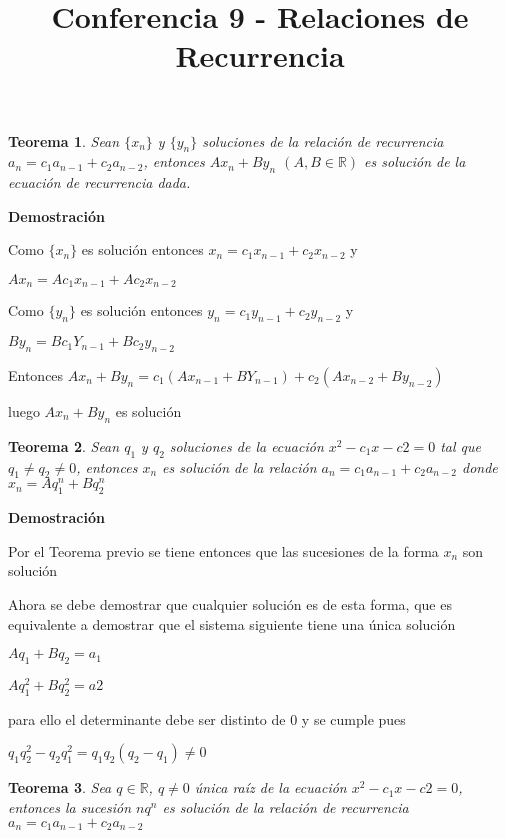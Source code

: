 \documentclass[a4paper,12pt]{report}
\title{Conferencia 9 - Relaciones de Recurrencia}
\author{}
\newtheorem*{teo}{Teorema}
\begin{document}
\maketitle




\begin{teo}
 Sean $\{x_n\}$ y $\{y_n\}$ soluciones de la relación de recurrencia\\ 
 $a_n=c_1a_{n-1}+c_2a_{n-2}$, entonces $Ax_n + By_n$  $(A,B\in\mathbb{R})$ es solución de la ecuación de recurrencia dada.
\end{teo}

\textbf{Demostración}

Como $\{x_n\}$ es solución entonces $x_n=c_1x_{n-1}+c_2x_{n-2}$ y

$Ax_n=Ac_1x_{n-1}+Ac_2x_{n-2}$

Como $\{y_n\}$ es solución entonces $y_n=c_1y_{n-1}+c_2y_{n-2}$ y

$By_n=Bc_1Y_{n-1}+Bc_2y_{n-2}$

Entonces $Ax_n+By_n=c_1(Ax_{n-1}+BY_{n-1})+c_2(Ax_{n-2}+By_{n-2})$

luego $Ax_n+By_n$ es solución

\begin{teo}
 Sean $q_1$ y $q_2$ soluciones de la ecuación $x^2-c_1x-c2=0$ tal que $q_1\neq q_2 \neq 0$, entonces $x_n$ es solución de la relación $a_n=c_1a_{n-1}+c_2a_{n-2}$ donde $x_n=Aq^n_1+Bq^n_2$
\end{teo}

\textbf{Demostración}

Por el Teorema previo se tiene entonces que las sucesiones de la forma $x_n$ son solución

Ahora se debe demostrar que cualquier solución es de esta forma, que es equivalente a demostrar que el sistema siguiente tiene una única solución

$Aq_1+Bq_2=a_1$

$Aq^2_1+Bq^2_2=a2$

para ello el determinante debe ser distinto de 0 y se cumple pues

$q_1q^2_2-q_2q^2_1=q_1q_2(q_2-q_1)\neq0$




\begin{teo}
 Sea $q\in\mathbb{R}$, $q\neq 0$ única raíz de la ecuación $x^2-c_1x-c2=0$, entonces la sucesión $nq^n$  es solución de la relación de recurrencia $a_n=c_1a_{n-1}+c_2a_{n-2}$
\end{teo}
\end{document}
